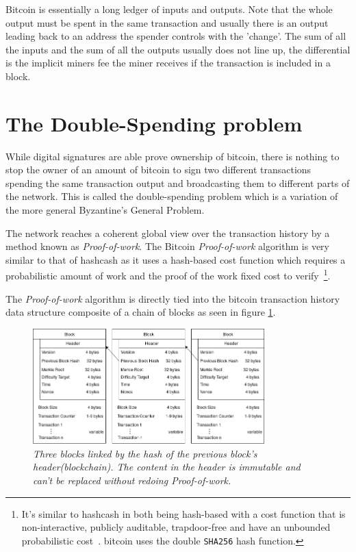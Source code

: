 Bitcoin is essentially a long ledger of inputs and outputs. Note that the whole output must be spent in the same transaction and usually there is an output leading back to an address the spender controls with the 'change'. The sum of all the inputs and the sum of all the outputs usually does not line up, the differential is the implicit miners fee the miner receives if the transaction is included in a block. 

\section{The Double-Spending problem}

While digital signatures are able prove ownership of bitcoin, there is nothing to stop the owner of an amount of bitcoin to sign two different transactions spending the same transaction output and broadcasting them to different parts of the network. This is called the double-spending problem which is a variation of the more general Byzantine's General Problem.


The network reaches a coherent global view over the transaction history by a method known as \textit{Proof-of-work}. The Bitcoin \textit{Proof-of-work} algorithm is very similar to that of hashcash as it uses a hash-based cost function which requires a probabilistic amount of work and the proof of the work fixed cost to verify~\cite{back:hashcash}\footnote{It's similar to hashcash in both being hash-based with a cost function that is non-interactive, publicly auditable, trapdoor-free and have an unbounded probabilistic cost~\cite{back:hashcash}.
\gls{bitcoin} uses the double \texttt{SHA256} hash function.}.

The \textit{Proof-of-work} algorithm is directly tied into the bitcoin transaction history data structure composite of a chain of blocks as seen in figure \ref{fig:blockchain}.

\begin{figure}[!htb]
	\hspace*{-0.4cm} 
	\centering
	\includegraphics[width=9cm]{images/blockchain.png}
	\caption{\textit{Three blocks linked by the hash of the previous block's header(\gls{blockchain}). The content in the header is immutable and can't be replaced without redoing \textit{Proof-of-work}.
	}}
	\label{fig:blockchain}
	\hspace{2mm} 
\end{figure}

